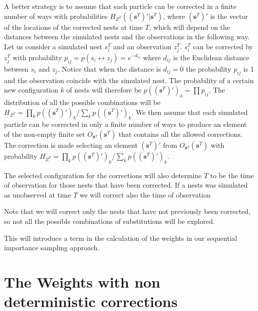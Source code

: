 \documentclass[11pt,a4paper]{article}
\renewcommand{\vec}[1]{\mathbf{#1}}
\begin{document}
{A better strategy is to assume that each particle can be corrected in a finite number of ways with probabilities $H_{Z^T}((\vec{s}^T)' | \vec{s}^T)$, where $(\vec{s}^T)'$ is the vector of the locations of the corrected nests at time $T$, which will depend on the distances between the simulated nests and the observations in the following way. Let us consider a simulated nest $s^T_i$ and an observation $z^T_j$. $s^T_i$ can be corrected by $z^T_j$ with probability $p_{ij} = p(s_i \leftrightarrow z_j) = e^{-d_{ij}}$ where $d_{ij}$ is the Euclidean distance between $s_i$ and $z_j$. Notice that when the distance is $d_{ij} = 0$ the probability $p_{ij}$ is 1 and the observation coincide with the simulated nest. The probability of a certain new configuration $k$ of nests will therefore be $p((\vec{s}^T)')_k = \prod p_{ij}$. The distribution of all the possible combinations will be $H_{Z^T} = \prod_k p((\vec{s}^T)')_k / \sum_k p((\vec{s}^T)')_k $. We then assume that each simulated particle can be corrected in only a finite number of ways to produce an element of the non-empty finite set $O_{\vec{z}^T} (\vec{s}^T)$ that contains all the allowed corrections. The correction is made selecting an element $(\vec{s}^T)'$ from $O_{\vec{z}^T} (\vec{s}^T)$ with probability $H_{Z^T} = \prod_k p((\vec{s}^T)')_k / \sum_k p((\vec{s}^T)')_k$.

The selected configuration for the corrections will also determine $T$ to be the time of observation for those nests that have been corrected. If a nests was simulated as unobserved at time $T$ we will correct also the time of observation

Note that we will correct only the nests that have not previously been corrected, so not all the possible combinations of substitutions will be explored.



This will introduce a term in the calculation of the weights in our sequential importance sampling approach.

\section{The Weights with non deterministic corrections}
}
\end{document}
